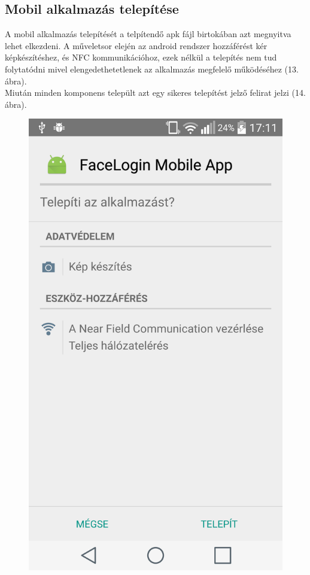 \subsection{Mobil alkalmazás telepítése}
A mobil alkalmazás telepítését a telpítendő apk fájl birtokában azt megnyitva lehet elkezdeni. A műveletsor elején az android rendszer hozzáférést kér képkészítéshez, és NFC kommunikációhoz, ezek nélkül a telepítés nem tud folytatódni mivel elengedethetetlenek az alkalmazás megfelelő működéséhez (13. ábra).
\\Miután minden komponens települt azt egy sikeres telepítést jelző felirat jelzi (14. ábra).
\begin{figure}[h]
 \begin{minipage}{.5\textwidth} 
\centering
    \includegraphics[scale=0.10]{img/install_app}

\end{minipage}
\end{figure}
